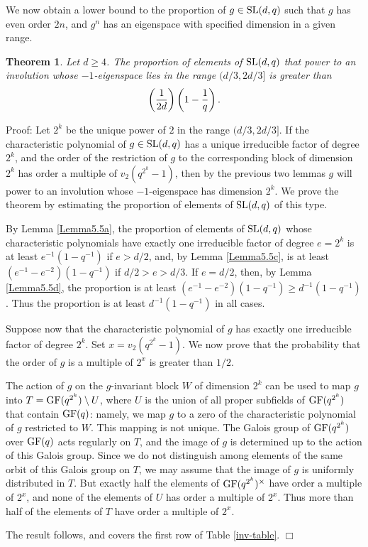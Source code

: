 \documentclass[12pt]{article}
\newtheorem{theorem}[definition]{Theorem}
\newenvironment{proof}{\normalsize {\sc Proof}:}{{\hfill $\Box$ \\}}
\def\SL{{\rm SL}}
\def\GF{{\rm GF}}
\begin{document}
We now obtain a lower bound to the proportion of 
$g\in\SL(d,q)$ such that $g$ has even order $2n$, and $g^n$
has an eigenspace with specified dimension in a given range. 
\begin{theorem}\label{Theorem5.1}  
Let $d\ge4$.  The proportion of elements of $\SL(d,q)$ that power 
to an involution
whose $-1$-eigenspace lies in the range $(d/3,2d/3]$ is greater than
$$\left({1\over 2d}\right)\left(1-{1\over q}\right).$$
\end{theorem}
\begin{proof}
Let $2^k$ be the unique power of $2$ in the range $(d/3,2d/3]$.  If the
characteristic polynomial of $g\in\SL(d,q)$
has a unique irreducible factor of degree $2^k$, and the order of 
the restriction
of $g$ to the corresponding block of dimension 
$2^k$ has order a multiple of $v_2(q^{2^k}-1)$,
then by the previous two lemmas $g$ will power to an 
involution whose $-1$-eigenspace has
dimension $2^k$.  We prove the theorem by estimating the 
proportion of elements of $\SL(d,q)$
of this type.  

By Lemma \ref{Lemma5.5a}, the proportion of elements 
of $\SL(d,q)$ whose characteristic
polynomials have exactly one irreducible factor of 
degree $e=2^k$ is at least $e^{-1}(1-q^{-1})$ if
$e>d/2$, and, by Lemma \ref{Lemma5.5c}, is at least 
$(e^{-1}-e^{-2})(1-q^{-1})$ if $d/2>e>d/3$.  
If $e=d/2$, then, by Lemma \ref{Lemma5.5d},
the proportion is at least  
$(e^{-1}-e^{-2})(1-q^{-1}) \geq d^{-1}(1-q^{-1})$.
Thus the proportion is at least $d^{-1}(1-q^{-1})$ in all cases.
  
Suppose now that the characteristic polynomial of $g$ has 
exactly one irreducible factor of degree $2^k$. 
Set $x=v_2(q^{2^k}-1)$. We now prove that the
probability that the order of $g$ is a 
multiple of $2^x$ is greater than $1/2$. 

The action of $g$ on the $g$-invariant block $W$ of dimension $2^k$ 
can be used to map $g$ into
$T=\GF(q^{2^k})\setminus U$, where $U$ is the union of all 
proper subfields of
$\GF(q^{2^k})$ that contain $\GF(q)$: namely, we map $g$ to a 
zero of the characteristic polynomial of $g$ 
restricted to $W$.  This mapping is not unique.
The Galois group of $\GF(q^{2^k})$ over $\GF(q)$ acts regularly on $T$,
and the image of $g$ is determined up to the action of this Galois group.
Since we do not distinguish among elements of the
same orbit of this Galois group on $T$, we may assume that the image of
$g$ is uniformly distributed in $T$.  But exactly half the elements of
$\GF(q^{2^k})^\times$ have order a multiple of $2^x$, and none of the 
elements of $U$
has order a multiple of $2^x$.  Thus more than half of the elements of $T$ 
have order a multiple of $2^x$.  

The result follows, and covers the first row of Table \ref{inv-table}.
\end{proof}
\end{document}
